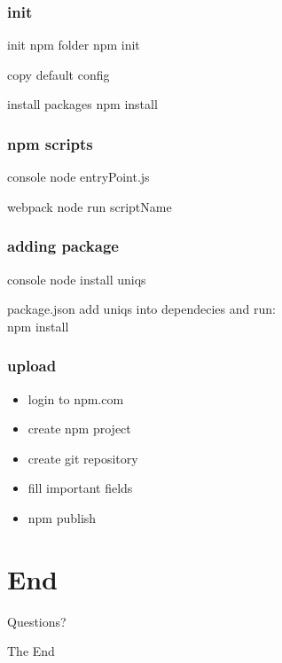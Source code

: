 \documentclass{beamer}
\begin{document}
\begin{frame}
\frametitle{init}
\begin{block}{init npm folder}
npm init
\end{block}
\begin{block}{copy default config}
\end{block}
\begin{block}{install packages}
npm install
\end{block}
\end{frame}

\begin{frame}
\frametitle{npm scripts}
\begin{block}{console}
node entryPoint.js
\end{block}
\begin{block}{webpack}
node run scriptName
\end{block}
\end{frame}

\begin{frame}
\frametitle{adding package}
\begin{block}{console}
node install uniqs
\end{block}
\begin{block}{package.json}
add uniqs into dependecies and run:\\
npm install
\end{block}

\end{frame}

\begin{frame}
\frametitle{upload}
\begin{itemize}
\item login to npm.com
\item create npm project
\item create git repository
\item fill important fields
\item npm publish
\end{itemize}
\end{frame}





\section{End}

\begin{frame}
\Huge{\centerline{Questions?}}
\end{frame}
\begin{frame}
\Huge{\centerline{The End}}
\end{frame}
\end{document}
